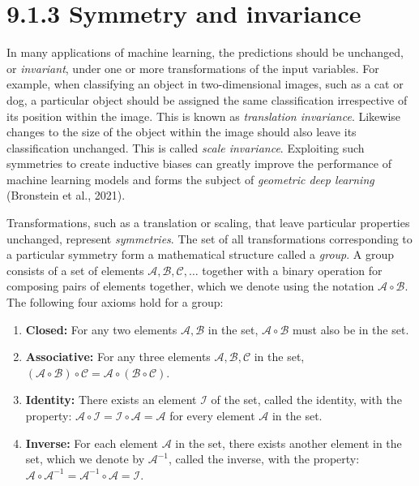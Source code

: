 \documentclass{article}
\begin{document}
\section{9.1.3 Symmetry and invariance}

In many applications of machine learning, the predictions should be unchanged, or \emph{invariant}, under one or more transformations of the input variables. For example, when classifying an object in two-dimensional images, such as a cat or dog, a particular object should be assigned the same classification irrespective of its position within the image. This is known as \emph{translation invariance}. Likewise changes to the size of the object within the image should also leave its classification unchanged. This is called \emph{scale invariance}. Exploiting such symmetries to create inductive biases can greatly improve the performance of machine learning models and forms the subject of \emph{geometric deep learning} (Bronstein et al., 2021).

Transformations, such as a translation or scaling, that leave particular properties unchanged, represent \emph{symmetries}. The set of all transformations corresponding to a particular symmetry form a mathematical structure called a \emph{group}. A group consists of a set of elements $\mathcal{A}, \mathcal{B}, \mathcal{C}, \dots$ together with a binary operation for composing pairs of elements together, which we denote using the notation $\mathcal{A} \circ \mathcal{B}$. The following four axioms hold for a group:

\begin{enumerate}
    \item \textbf{Closed:} For any two elements $\mathcal{A}, \mathcal{B}$ in the set, $\mathcal{A} \circ \mathcal{B}$ must also be in the set.
    
    \item \textbf{Associative:} For any three elements $\mathcal{A}, \mathcal{B}, \mathcal{C}$ in the set, $(\mathcal{A} \circ \mathcal{B}) \circ \mathcal{C} = \mathcal{A} \circ (\mathcal{B} \circ \mathcal{C})$.
    
    \item \textbf{Identity:} There exists an element $\mathcal{I}$ of the set, called the identity, with the property: $\mathcal{A} \circ \mathcal{I} = \mathcal{I} \circ \mathcal{A} = \mathcal{A}$ for every element $\mathcal{A}$ in the set.
    
    \item \textbf{Inverse:} For each element $\mathcal{A}$ in the set, there exists another element in the set, which we denote by $\mathcal{A}^{-1}$, called the inverse, with the property: $\mathcal{A} \circ \mathcal{A}^{-1} = \mathcal{A}^{-1} \circ \mathcal{A} = \mathcal{I}$.
\end{enumerate}
\end{document}
